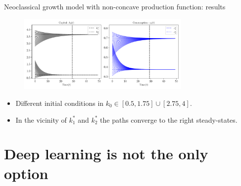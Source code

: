 \documentclass[aspectratio=169,10pt]{beamer}
\begin{document}
\begin{frame}{Neoclassical growth model with non-concave production function: results}
	\begin{figure}[t!]
		\centering
		\includegraphics[width=0.75\textwidth]{figs/growth_sequential_multiple_steady_states_var_initial_k_0.pdf}
	\end{figure}
	\begin{itemize}
		\item Different initial conditions in $k_0 \in [0.5,1.75]\cup[2.75,4]$.
		\smallskip
		\item In the vicinity of $k_1^*$ and $k_2^*$ the paths converge to the right steady-states.
	\end{itemize}
\end{frame}

\section{Deep learning is not the only option}
\end{document}

